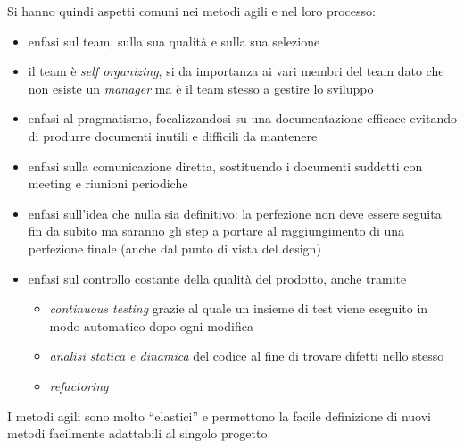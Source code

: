 \documentclass[a4paper,12pt, oneside]{book}
\begin{document}
Si hanno quindi aspetti comuni nei metodi agili e nel loro processo:
\begin{itemize}
  \item enfasi sul team, sulla sua qualità e sulla sua selezione
  \item il team è \textit{self organizing}, si da importanza ai vari membri del
  team dato che non esiste un \textit{manager} ma
  è il team stesso a gestire lo sviluppo
  \item enfasi al pragmatismo, focalizzandosi su una documentazione
  efficace evitando di produrre documenti inutili e difficili da mantenere
  \item enfasi sulla comunicazione diretta, sostituendo i documenti suddetti con 
  meeting e riunioni periodiche
  \item enfasi sull'idea che nulla sia definitivo: la perfezione non deve essere 
  seguita fin da subito ma saranno gli step a portare al
  raggiungimento di una perfezione finale (anche dal punto di vista del design)
  \item enfasi sul controllo costante della qualità del prodotto, anche tramite
    \begin{itemize}
      \item \textit{continuous testing} grazie al quale un insieme
  di test viene eseguito in modo automatico dopo ogni modifica
      \item \textit{analisi statica e dinamica} del codice al fine di trovare difetti
  nello stesso
      \item \textit{refactoring}
    \end{itemize}

\end{itemize}
I metodi agili sono molto ``elastici'' e permettono la facile
  definizione di nuovi metodi facilmente adattabili al singolo progetto.
\end{document}
